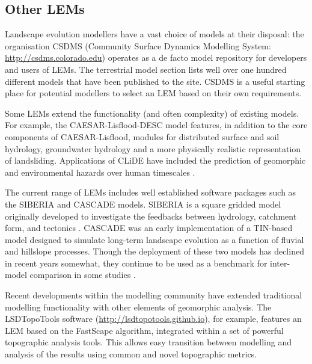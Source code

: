 \subsection{Other LEMs}

Landscape evolution modellers have a vast choice of models at their disposal: the organisation CSDMS (Community Surface Dynamics Modelling System: \url{http://csdms.colorado.edu}) operates as a de facto model repository for developers and users of LEMs. The terrestrial model section lists well over one hundred different models that have been published to the site. CSDMS is a useful starting place for potential modellers to select an LEM based on their own requirements.  


Some LEMs extend the functionality (and often complexity) of existing models. For example, the CAESAR-Lisflood-DESC model \citep{Barkwith2015} features, in addition to the core components of CAESAR-Lisflood, modules for distributed surface and soil hydrology, groundwater hydrology and a more physically realistic representation of landsliding. Applications of CLiDE have included the prediction of geomorphic and environmental hazards over human timescales \citep[e.g.][]{tye2013nene,Barkwith2015}. 

The current range of LEMs includes well established software packages such as the SIBERIA and CASCADE models. SIBERIA \citep{Willgoose1991a} is a square gridded model originally developed to investigate the feedbacks between hydrology, catchment form, and tectonics \citep{willgoose1994hydrogeomorphology}. CASCADE \citep{Braun1997} was an early implementation of a TIN-based model designed to simulate long-term landscape evolution as a function of fluvial and hillslope processes.  Though the deployment of these two models has declined in recent years somewhat, they continue to be used as a benchmark for inter-model comparison in some studies \citep[e.g.][]{Hancock2015}.

Recent developments within the modelling community have extended traditional modelling functionality with other elements of geomorphic analysis.  The LSDTopoTools software (\url{http://lsdtopotools.github.io}), for example, features an LEM based on the FastScape algorithm, integrated within a set of powerful topographic analysis tools. This allows easy transition between modelling and analysis of the results using common and novel topographic metrics. 

